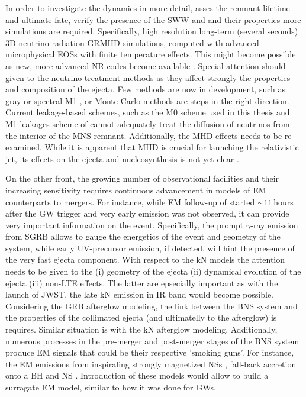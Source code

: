 In order to investigate the \pmerg{} dynamics in more detail, asses the remnant 
lifetime and ultimate fate, verify the presence of the \ac{SWW} and \nwind{} and 
their properties more simulations are required. Specifically, 
high resolution long-term (several seconds) $3$D neutrino-radiation \ac{GRMHD} 
simulations, computed with advanced microphysical \acp{EOS} with finite temperature effects.
This might become possible as new, more advanced \ac{NR} codes become available 
\citep[\eg][]{Daszuta:2021ecf}.
Special attention should given to the neutrino treatment methods as they affect strongly the 
properties and composition of the ejecta.
Few methods are now in development, such as gray or spectral M1 \citep{Foucart:2016rxm,Roberts:2016lzn},
or Monte-Carlo methods are steps in the right direction. Current leakage-based schemes, such as 
the M0 scheme used in this thesis and M1-leakages scheme of \citet{Sekiguchi:2015dma,Fujibayashi:2017puw}
cannot adequately treat the diffusion of neutrinos from the interior of the \ac{MNS} remnant.
Additionally, the \ac{MHD} effects needs to be re-examined. While it is 
apparent that \ac{MHD} is crucial for launching the relativistic jet, its effects on the 
ejecta and nucleosynthesis is not yet clear \citep{Siegel:2017jug, Fernandez:2018kax}.

On the other front, the growing number of observational facilities and their increasing 
sensitivity requires continuous advancement in models of \ac{EM} counterparts to mergers.
For instance, while \ac{EM} follow-up of \GW{} started ${\sim11}\,$hours after the \ac{GW} 
trigger and very early emission was not observed, it can provide very important information
on the event. Specifically, the prompt $\gamma$-ray emission from \ac{SGRB} allows to 
gauge the energetics of the event and geometry of the system, while early UV-precursor 
emission, if detected, will hint the presence of the very fast ejecta component. 
With respect to the \ac{kN} models the attention needs to be given to the (i) geometry 
of the ejecta (ii) dynamical evolution of the ejecta (iii) non-\ac{LTE} effects.
The latter are epsecially important as with the launch of \ac{JWST}, the late \ac{kN} 
emission in \ac{IR} band would become possible. 
Considering the \ac{GRB} afterglow modeling, the link between the \ac{BNS} system 
and the properties of the collimated ejecta (and ultimatelly to the afterglow) is 
requires. Similar situation is with the \ac{kN} afterglow modeling.
Additionally, numerous processes in the pre-merger and post-merger stages of the 
\ac{BNS} system produce \ac{EM} signals that could be their respective 'smoking guns'. 
For instance, the \ac{EM} emissions from inspiraling strongly magnetized \acp{NS} 
\citep[\eg]{Beloborodov:2020ylo}, fall-back accretion onto a \ac{BH} \citep[\eg]{Desai:2018rbc}
and \ac{NS} \citep[\eg]{Gibson:2017dep}.
Introduction of these models would allow to build a surragate \ac{EM} model, similar 
to how it was done for \acp{GW}.

